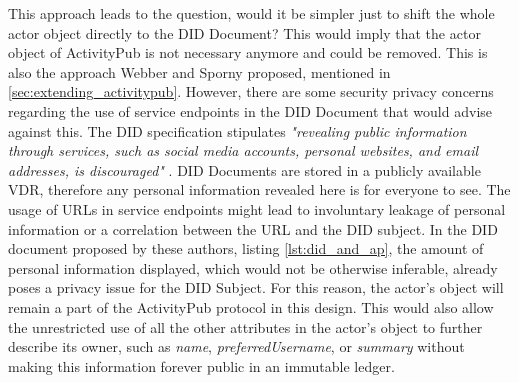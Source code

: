 This approach leads to the question, would it be simpler just to shift the whole actor object directly to the DID Document? This would imply that the actor object of ActivityPub is not necessary anymore and could be removed. This is also the approach Webber and Sporny proposed, mentioned in \ref{sec:extending_activitypub}. However, there are some security privacy concerns regarding the use of service endpoints in the DID Document that would advise against this. The DID specification stipulates \emph{"revealing public information through services, such as social media accounts, personal websites, and email addresses, is discouraged"} \cite{sporny_longley_sabadello_reed_steele_2021}. DID Documents are stored in a publicly available VDR, therefore any personal information revealed here is for everyone to see. The usage of URLs in service endpoints might lead to involuntary leakage of personal information or a correlation between the URL and the DID subject. In the DID document proposed by these authors, listing \ref{lst:did_and_ap}, the amount of personal information displayed, which would not be otherwise inferable, already poses a privacy issue for the DID Subject. For this reason, the actor's object will remain a part of the ActivityPub protocol in this design. This would also allow the unrestricted use of all the other attributes in the actor's object to further describe its owner, such as \emph{name}, \emph{preferredUsername}, or \emph{summary} without making this information forever public in an immutable ledger.


